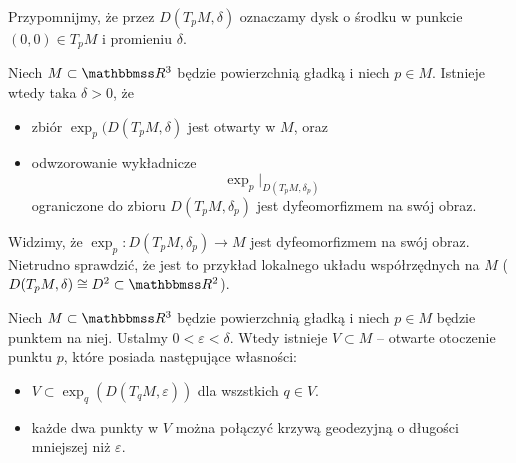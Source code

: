 \begin{frame}
Przypomnijmy, że przez $D(T_pM,\delta)$ oznaczamy dysk o środku w punkcie 
$(0,0)\in T_pM$ i promieniu $\delta$.


\begin{lemat}
Niech $M\subset \R^3$ będzie powierzchnią gładką i niech $p\in M$. Istnieje wtedy taka $\delta>0$, że 
\begin{itemize} 
\item zbiór $\exp_p(D(T_pM,\delta)$ jest otwarty w $M$, oraz
\pause \item odwzorowanie wykładnicze \[\exp_p\big|_{D(T_pM,\delta_p)}\] ograniczone do zbioru $D(T_pM,\delta_p)$ jest dyfeomorfizmem na swój obraz.
\end{itemize}
\end{lemat}

\pause

\end{frame}
\begin{frame}


\begin{uwaga}
Widzimy, że $\exp_p\colon D(T_pM,\delta_p)\to M$ jest dyfeomorfizmem na swój obraz. Nietrudno sprawdzić, że jest to przykład lokalnego układu współrzędnych na $M$ ($D(T_pM,\delta)\cong D^2\subset \R^2$). 
\end{uwaga}

\pause\begin{wniosek}
Niech $M\subset\R^3$ będzie powierzchnią gładką i niech $p\in M$ będzie punktem na niej. Ustalmy $0<\varepsilon<\delta$. Wtedy istnieje $V\subset M$ -- otwarte otoczenie punktu $p$, które posiada następujące własności:
\begin{itemize}
\item $V\subset \exp_q(D(T_qM,\varepsilon))$ dla wszstkich $q\in V$.
\pause \item każde dwa punkty w $V$ można połączyć krzywą geodezyjną o długości mniejszej niż $\varepsilon$.
\end{itemize}
\end{wniosek}

\end{frame}

